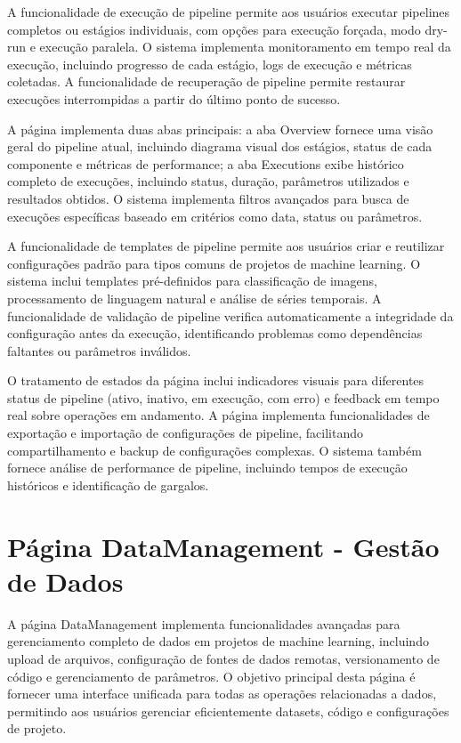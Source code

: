\documentclass[12pt,a4paper]{article}
\begin{document}
A funcionalidade de execução de pipeline permite aos usuários executar pipelines completos ou estágios individuais, com opções para execução forçada, modo dry-run e execução paralela. O sistema implementa monitoramento em tempo real da execução, incluindo progresso de cada estágio, logs de execução e métricas coletadas. A funcionalidade de recuperação de pipeline permite restaurar execuções interrompidas a partir do último ponto de sucesso.

A página implementa duas abas principais: a aba Overview fornece uma visão geral do pipeline atual, incluindo diagrama visual dos estágios, status de cada componente e métricas de performance; a aba Executions exibe histórico completo de execuções, incluindo status, duração, parâmetros utilizados e resultados obtidos. O sistema implementa filtros avançados para busca de execuções específicas baseado em critérios como data, status ou parâmetros.

A funcionalidade de templates de pipeline permite aos usuários criar e reutilizar configurações padrão para tipos comuns de projetos de machine learning. O sistema inclui templates pré-definidos para classificação de imagens, processamento de linguagem natural e análise de séries temporais. A funcionalidade de validação de pipeline verifica automaticamente a integridade da configuração antes da execução, identificando problemas como dependências faltantes ou parâmetros inválidos.

O tratamento de estados da página inclui indicadores visuais para diferentes status de pipeline (ativo, inativo, em execução, com erro) e feedback em tempo real sobre operações em andamento. A página implementa funcionalidades de exportação e importação de configurações de pipeline, facilitando compartilhamento e backup de configurações complexas. O sistema também fornece análise de performance de pipeline, incluindo tempos de execução históricos e identificação de gargalos.

\section{Página DataManagement - Gestão de Dados}

A página DataManagement implementa funcionalidades avançadas para gerenciamento completo de dados em projetos de machine learning, incluindo upload de arquivos, configuração de fontes de dados remotas, versionamento de código e gerenciamento de parâmetros. O objetivo principal desta página é fornecer uma interface unificada para todas as operações relacionadas a dados, permitindo aos usuários gerenciar eficientemente datasets, código e configurações de projeto.
\end{document}

